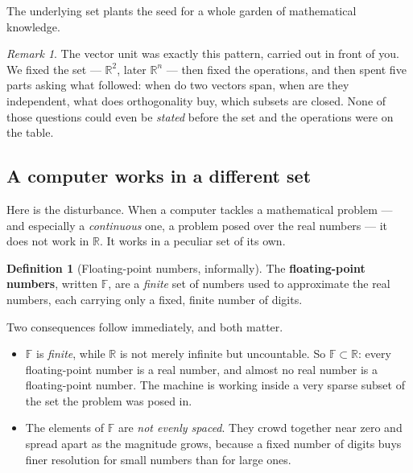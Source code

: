 \documentclass[11pt]{article}
\theoremstyle{plain}
\theoremstyle{definition}
\newtheorem{defn}{Definition}[section]
\theoremstyle{remark}
\newtheorem*{rmk}{Remark}
\newcommand{\R}{\mathbb{R}}
\newcommand{\F}{\mathbb{F}}
\begin{document}
\noindent The underlying set plants the seed for a whole garden of mathematical
knowledge.

\begin{rmk}
The vector unit was exactly this pattern, carried out in front of you. We fixed
the set --- $\R^{2}$, later $\R^{n}$ --- then fixed the operations, and then
spent five parts asking what followed: when do two vectors span, when are they
independent, what does orthogonality buy, which subsets are closed. None of
those questions could even be \emph{stated} before the set and the operations
were on the table.
\end{rmk}

\subsection{A computer works in a different set}
Here is the disturbance. When a computer tackles a mathematical problem --- and
especially a \emph{continuous} one, a problem posed over the real numbers --- it
does not work in $\R$. It works in a peculiar set of its own.

\begin{defn}[Floating-point numbers, informally]
The \textbf{floating-point numbers}, written $\F$, are a \emph{finite} set of
numbers used to approximate the real numbers, each carrying only a fixed,
finite number of digits.
\end{defn}

\noindent Two consequences follow immediately, and both matter.

\begin{itemize}[leftmargin=1.4em,itemsep=4pt]
  \item $\F$ is \emph{finite}, while $\R$ is not merely infinite but
        uncountable. So $\F\subset\R$: every floating-point number is a real
        number, and almost no real number is a floating-point number. The
        machine is working inside a very sparse subset of the set the problem
        was posed in.
  \item The elements of $\F$ are \emph{not evenly spaced}. They crowd together
        near zero and spread apart as the magnitude grows, because a fixed
        number of digits buys finer resolution for small numbers than for large
        ones.
\end{itemize}
\end{document}
